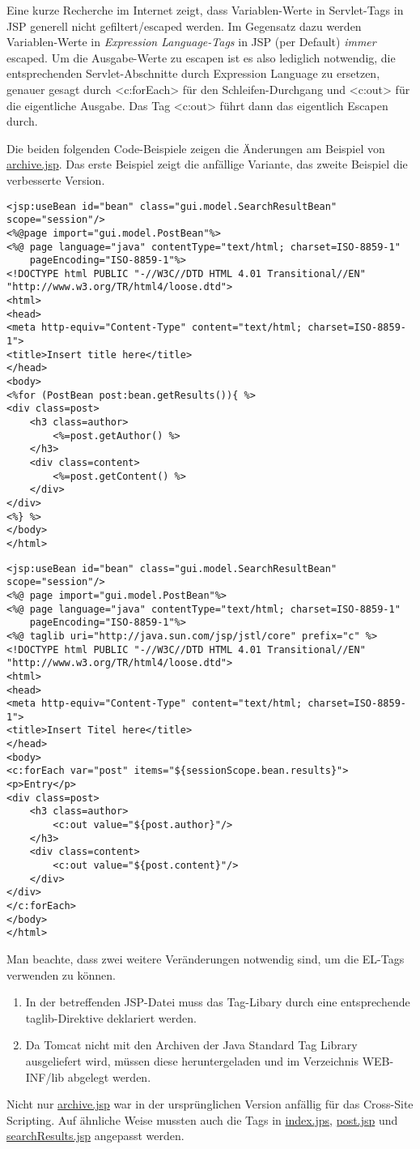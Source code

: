Eine kurze Recherche im Internet zeigt, dass Variablen-Werte in Servlet-Tags in JSP generell nicht gefiltert/escaped werden. Im Gegensatz dazu werden Variablen-Werte in \emph{Expression Language-Tags} in JSP (per Default) \emph{immer} escaped. Um die Ausgabe-Werte zu escapen ist es also lediglich notwendig, die entsprechenden Servlet-Abschnitte durch Expression Language zu ersetzen, genauer gesagt durch <c:forEach> für den Schleifen-Durchgang und <c:out> für die eigentliche Ausgabe. Das Tag <c:out> führt dann das eigentlich Escapen durch.

Die beiden folgenden Code-Beispiele zeigen die Änderungen am Beispiel von \url{archive.jsp}. Das erste Beispiel zeigt die anfällige Variante, das zweite Beispiel die verbesserte Version.

\begin{lstlisting}
<jsp:useBean id="bean" class="gui.model.SearchResultBean" scope="session"/>
<%@page import="gui.model.PostBean"%>
<%@ page language="java" contentType="text/html; charset=ISO-8859-1"
    pageEncoding="ISO-8859-1"%>
<!DOCTYPE html PUBLIC "-//W3C//DTD HTML 4.01 Transitional//EN" "http://www.w3.org/TR/html4/loose.dtd">
<html>
<head>
<meta http-equiv="Content-Type" content="text/html; charset=ISO-8859-1">
<title>Insert title here</title>
</head>
<body>
<%for (PostBean post:bean.getResults()){ %>
<div class=post>
	<h3 class=author>
		<%=post.getAuthor() %>
	</h3>
	<div class=content>
		<%=post.getContent() %>
	</div>
</div>
<%} %>
</body>
</html>
\end{lstlisting}

\begin{lstlisting}
<jsp:useBean id="bean" class="gui.model.SearchResultBean" scope="session"/>
<%@ page import="gui.model.PostBean"%>
<%@ page language="java" contentType="text/html; charset=ISO-8859-1"
    pageEncoding="ISO-8859-1"%>
<%@ taglib uri="http://java.sun.com/jsp/jstl/core" prefix="c" %>    
<!DOCTYPE html PUBLIC "-//W3C//DTD HTML 4.01 Transitional//EN" "http://www.w3.org/TR/html4/loose.dtd">
<html>
<head>
<meta http-equiv="Content-Type" content="text/html; charset=ISO-8859-1">
<title>Insert Titel here</title>
</head>
<body>
<c:forEach var="post" items="${sessionScope.bean.results}">
<p>Entry</p>
<div class=post>
	<h3 class=author>
		<c:out value="${post.author}"/>
	</h3>
	<div class=content>
		<c:out value="${post.content}"/>
	</div>
</div>
</c:forEach>
</body>
</html>
\end{lstlisting}

Man beachte, dass zwei weitere Veränderungen notwendig sind, um die EL-Tags verwenden zu können.
\begin{enumerate}
\item In der betreffenden JSP-Datei muss das Tag-Libary durch eine entsprechende taglib-Direktive deklariert werden. 
\item Da Tomcat nicht mit den Archiven der Java Standard Tag Library ausgeliefert wird, müssen diese heruntergeladen und im Verzeichnis WEB-INF/lib abgelegt werden.
\end{enumerate}

Nicht nur \url{archive.jsp} war in der ursprünglichen Version anfällig für das Cross-Site Scripting. Auf ähnliche Weise mussten auch die Tags in \url{index.jps}, \url{post.jsp} und \url{searchResults.jsp} angepasst werden.



